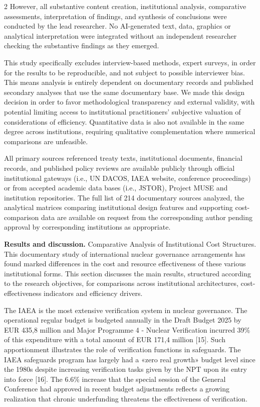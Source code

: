 \begin{multicols}{2}
However, all substantive content creation, institutional analysis,
comparative assessments, interpretation of findings, and synthesis of
conclusions were conducted by the lead researcher. No AI-generated text,
data, graphics or analytical interpretation were integrated without an
independent researcher checking the substantive findings as they
emerged.

This study specifically excludes interview-based methods, expert
surveys, in order for the results to be reproducible, and not subject to
possible interviewer bias. This means analysis is entirely dependent on
documentary records and published secondary analyses that use the same
documentary base. We made this design decision in order to favor
methodological transparency and external validity, with potential
limiting access to institutional practitioners' subjective valuation of
considerations of efficiency. Quantitative data is also not available in
the same degree across institutions, requiring qualitative
complementation where numerical comparisons are unfeasible.

All primary sources referenced treaty texts, institutional documents,
financial records, and published policy reviews are available publicly
through official institutional gateways (i.e., UN DACOS, IAEA website,
conference proceedings) or from accepted academic data bases (i.e.,
JSTOR), Project MUSE and institution repositories. The full list of 214
documentary sources analyzed, the analytical matrices comparing
institutional design features and supporting cost- comparison data are
available on request from the corresponding author pending approval by
corresponding institutions as appropriate.

{\bfseries Results and discussion.} Comparative Analysis of Institutional
Cost Structures. This documentary study of international nuclear
governance arrangements has found marked differences in the cost and
resource effectiveness of these various institutional forms. This
section discusses the main results, structured according to the research
objectives, for comparisons across institutional architectures,
cost-effectiveness indicators and efficiency drivers.

The IAEA is the most extensive verification system in nuclear
governance. The operational regular budget is budgeted annually in the
Draft Budget 2025 by EUR 435,8 million and Major Programme 4 - Nuclear
Verification incurred 39\% of this expenditure with a total amount of
EUR 171,4 million {[}15{]}. Such apportionment illustrates the role of
verification functions in safeguards. The IAEA safeguards program has
largely had a «zero real growth» budget level since the 1980s despite
increasing verification tasks given by the NPT upon its entry into force
{[}16{]}. The 6.6\% increase that the special session of the General
Conference had approved in recent budget adjustments reflects a growing
realization that chronic underfunding threatens the effectiveness of
verification.


\end{multicols}
